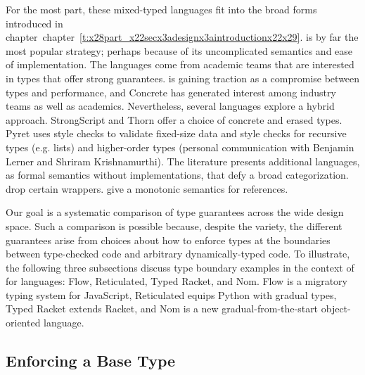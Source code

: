 \documentclass[ twoside,open=right,titlepage,numbers=noenddot,headinclude,%
                footinclude=true,cleardoublepage=empty,abstract=off,
                BCOR=5mm,paper=a4,fontsize=11pt,%
                ngerman,american,%
                parts,pdfspacing]{scrreprt}
\newcommand{\ChapRef}[2]{\SecRef{#1}{#2}}
\newcommand{\SecRef}[2]{section~#1}
\newcommand{\ChapRefLocal}[3]{\hyperref[#1]{\ChapRef{#2}{#3}}}
\newcommand{\Ssubsubsection}[2]{\subsubsection[#1]{#2}}
\renewcommand{\Ssubsubsection}[2]{\subsection[#1]{#2}}
\renewcommand{\ChapRefLocal}[3]{chapter~\ref{#1}}
\begin{document}
For the most part, these mixed{-}typed languages fit into the broad forms
 introduced in chapter~\ChapRefLocal{t:x28part_x22secx3adesignx3aintroductionx22x29}{4}{Design Analysis Method}.
\relax{\ename} is by far the most popular strategy; perhaps because of its
 uncomplicated semantics and ease of implementation.
The \relax{\nname} languages come from academic teams that are interested in
 types that offer strong guarantees.
\relax{\tname} is gaining traction as a compromise between types and performance,
 and Concrete has generated interest among industry teams
 as well as academics.
Nevertheless, several languages explore a hybrid approach.
StrongScript and Thorn offer a choice of concrete and erased types.
Pyret uses \relax{\nname}{-}style checks to validate fixed{-}size data and \relax{\tname}{-}style checks
 for recursive types (e.g. lists) and higher{-}order types
 (personal communication with Benjamin Lerner and Shriram Krishnamurthi).
The literature presents additional languages, as formal semantics without implementations, that defy a broad categorization.
 drop certain wrappers.
 give a monotonic semantics for references.

Our goal is a systematic comparison of type guarantees across the wide design space.
Such a comparison is possible because, despite the variety, the different guarantees
 arise from choices about how to enforce types at the boundaries between
 type{-}checked code and arbitrary dynamically{-}typed code.
To illustrate, the following three subsections discuss type boundary examples in the
 context of for languages:
  Flow,
  Reticulated,
  Typed Racket,
  and Nom.
Flow is a migratory typing system for JavaScript,
 Reticulated equips Python with gradual types,
 Typed Racket extends Racket,
 and Nom is a new gradual{-}from{-}the{-}start object{-}oriented language.

\Ssubsubsection{Enforcing a Base Type}{Enforcing a Base Type}\label{t:x28part_x22Enforcingx5fax5fBasex5fTypex22x29}
\end{document}
